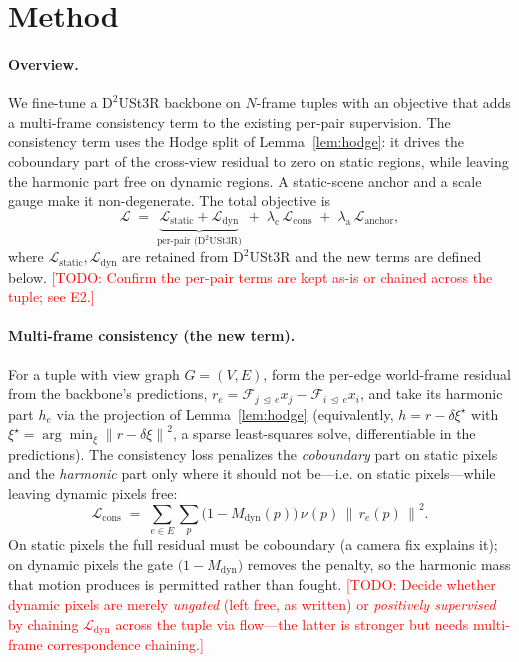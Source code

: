 \documentclass{article}
\newcommand{\norm}[1]{\left\lVert #1 \right\rVert}
\newcommand{\sheaf}{\mathcal{F}}
\newcommand{\coboundary}{\delta}
\newcommand{\restr}[2]{\sheaf_{#1 \,\trianglelefteq\, #2}}
\newcommand{\Mdyn}{M_{\mathrm{dyn}}}
\newcommand{\Lcons}{\mathcal{L}_{\mathrm{cons}}}
\newcommand{\Ldyn}{\mathcal{L}_{\mathrm{dyn}}}
\newcommand{\Lstatic}{\mathcal{L}_{\mathrm{static}}}
\newcommand{\Lanchor}{\mathcal{L}_{\mathrm{anchor}}}
\newcommand{\todo}[1]{\textcolor{red}{[TODO: #1]}}
\theoremstyle{definition}
\theoremstyle{plain}
\theoremstyle{remark}
\begin{document}
\section{Method}
\label{sec:method}

\paragraph{Overview.}
We fine-tune a $\mathrm{D}^2$USt3R backbone on $N$-frame tuples with an
objective that adds a multi-frame consistency term to the existing
per-pair supervision. The consistency term uses the Hodge split of
Lemma~\ref{lem:hodge}: it drives the coboundary part of the cross-view
residual to zero on static regions, while leaving the harmonic part free
on dynamic regions. A static-scene anchor and a scale gauge make it
non-degenerate. The total objective is
\begin{equation}
  \mathcal{L}
  \;=\;
  \underbrace{\Lstatic + \Ldyn}_{\text{per-pair (D$^2$USt3R)}}
  \;+\;
  \lambda_{\mathrm{c}}\,\Lcons
  \;+\;
  \lambda_{\mathrm{a}}\,\Lanchor,
  \label{eq:total}
\end{equation}
where $\Lstatic,\Ldyn$ are retained from $\mathrm{D}^2$USt3R and the new
terms are defined below. \todo{Confirm the per-pair terms are kept as-is
or chained across the tuple; see E2.}

\paragraph{Multi-frame consistency (the new term).}
For a tuple with view graph $G=(V,E)$, form the per-edge world-frame
residual from the backbone's predictions,
$r_e = \restr{j}{e}x_j - \restr{i}{e}x_i$, and take its harmonic part
$h_e$ via the projection of Lemma~\ref{lem:hodge}
(equivalently, $h = r - \coboundary\xi^\star$ with
$\xi^\star=\arg\min_\xi\norm{r-\coboundary\xi}^2$, a sparse least-squares
solve, differentiable in the predictions). The consistency loss penalizes
the \emph{coboundary} part on static pixels and the \emph{harmonic} part
only where it should not be---i.e. on static pixels---while leaving
dynamic pixels free:
\begin{equation}
  \Lcons
  \;=\;
  \sum_{e\in E}\sum_{p}
  \big(1-\Mdyn(p)\big)\,
  \nu(p)\,
  \norm{\,r_e(p)\,}^2 .
  \label{eq:cons}
\end{equation}
On static pixels the full residual must be coboundary (a camera fix
explains it); on dynamic pixels the gate $\big(1-\Mdyn\big)$ removes the
penalty, so the harmonic mass that motion produces is permitted rather
than fought. \todo{Decide whether dynamic pixels are merely \emph{ungated}
(left free, as written) or \emph{positively supervised} by chaining
$\Ldyn$ across the tuple via flow---the latter is stronger but needs
multi-frame correspondence chaining.}
\end{document}
